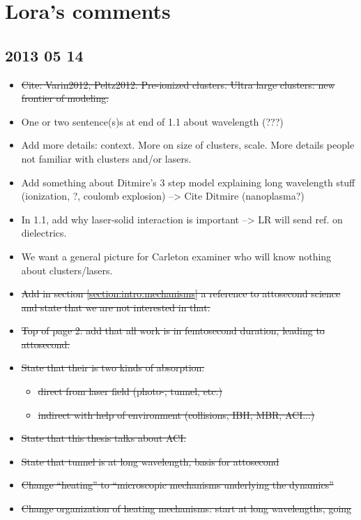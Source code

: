 \section*{Lora's comments}

\subsection*{2013 05 14}

\begin{itemize}
\item \sout{Cite: Varin2012, Peltz2012. Pre-ionized
clusters. Ultra large clusters: new frontier of modeling.}
\item One or two sentence(s)s at end of 1.1 about wavelength (???)
\item Add more details: context. More on size of clusters, scale. More details
people not familiar with clusters and/or lasers.
\item Add something about Ditmire's 3 step model explaining long wavelength stuff
(ionization, ?, coulomb explosion) --> Cite Ditmire (nanoplasma?)
\item In 1.1, add why laser-solid interaction is important --> LR will send ref.
on dielectrics.
\item We want a general picture for Carleton examiner who will know nothing about
clusters/lasers.
\item \sout{Add in section \ref{section:intro:mechanisms} a reference to
attosecond science and state that we are not interested in that.}
\item \sout{Top of page 2: add that all work is in femtosecond duration, leading to
attosecond.}
\item \sout{State that their is two kinds of absorption:}
    \begin{itemize}
    \item \sout{direct from laser field (photo-, tunnel, etc.)}
    \item \sout{indirect with help of environment (collisions, IBH, MBR, ACI...)}
    \end{itemize}
\item \sout{State that this thesis talks about ACI.}
\item \sout{State that tunnel is at long wavelength, basis for attosecond}
\item \sout{Change ``heating'' to ``microscopic mechanisms underlying the dynamics''}
\item \sout{Change organization of heating mechanisms: start at long wavelengths, going
}
\end{itemize}
